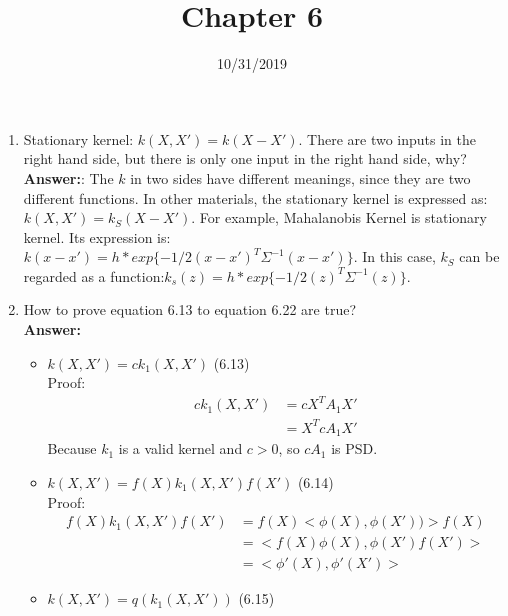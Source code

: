 \documentclass[10.5pt]{article}
\title{ \vspace{-2em} \bf Chapter 6 \vspace{-2.2em} }
\date{10/31/2019}
\begin{document}
\newcommand{\cemph}[1]{{\color{BrickRed} \bfseries {#1}}}
\renewcommand{\theenumi}{\alph{enumi}}
\maketitle
\thispagestyle{fancy}

\renewcommand{\theenumi}{\arabic{enumi}}

\newcommand{\qy}[1]{\textcolor{blue}{\commentm{QY: #1}}}



\begin{enumerate}
    \item Stationary kernel: $k(X,X') = k(X-X')$. There are two inputs in the right hand side, but there is only one input in the right hand side, why?\\
    {\bf{Answer:}}: The $k$ in two sides have different meanings, since they are two different functions. In other materials, the stationary kernel is expressed as: $k(X, X') = k_S(X-X')$. For example, Mahalanobis Kernel is stationary kernel. Its expression is: $k(x-x')= h*exp\{-1/2(x-x')^T \Sigma^{-1}(x-x')\}$. In this case, $k_S$ can be regarded as a function:$k_s(z)=h*exp\{-1/2(z)^T \Sigma^{-1}(z)\}$.
    \item How to prove equation 6.13 to equation 6.22 are true? \\
    {\bf{Answer:}}
    \begin{itemize}
        \item $k(X, X') = ck_1(X, X')$                                           (6.13)\\
        Proof: \begin{align}
            ck_1(X, X') &= cX^TA_1X'\\
            &=X^TcA_1X'
        \end{align}
        Because $k_1$ is a valid kernel and $c>0$, so $cA_1$ is PSD. 
        \item $k(X, X') = f(X)k_1(X, X')f(X')$                                    (6.14)\\
        Proof: \begin{align}
            f(X)k_1(X, X')f(X') &= f(X)<\phi(X),\phi(X'))>f(X)\\
            &=<f(X)\phi(X),\phi(X')f(X')>\\
            &=<\phi'(X),\phi'(X')>
        \end{align}
        \item $k(X, X') = q(k_1(X, X'))$                                    (6.15)\\

\end{itemize}
\end{enumerate}
\end{document}

